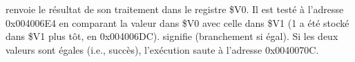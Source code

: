\scanf renvoie le résultat de son traitement dans le registre \$V0. Il est testé à l'adresse 0x004006E4
en comparant la valeur dans \$V0 avec celle dans \$V1 (1 a été stocké dans \$V1 plus tôt, en 0x004006DC).
 signifie  (branchement si égal).
Si les deux valeurs sont égales (i.e., succès), l'exécution saute à l'adresse 0x0040070C.
